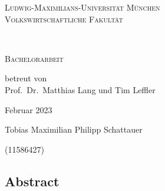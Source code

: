 \begin{titlepage}
    \vspace*{\fill}
    \centering

    \textsc{\Large Ludwig-Maximilians-Universität München}\\
    \textsc{Volkswirtschaftliche Fakultät}

    \vspace{3.2cm}

    \begin{doublespace}
        \makeatletter
        \textsc{ \Huge \titleDE}\\
        \textsc{\Large \subtitleDE}
        \makeatother
    \end{doublespace}


    \vspace{2.7cm}
    \huge \textsc{Bachelorarbeit}



    \vspace{0.3cm}
    \large \textrm{betreut von\\Prof.~Dr.~Matthias Lang und Tim Leffler}

    \vspace{2cm}
    \huge
    \textrm{Februar 2023}

    \vspace{2cm}
    \Large{\textrm{Tobias Maximilian Philipp Schattauer}}

    (11586427)

    \vspace*{\fill}
\end{titlepage}

\begin{titlepage}
    \null\vspace{3cm}
    \centering
    \begin{minipage}{0.8\textwidth}
        \section*{Abstract}
        
    \end{minipage}
\end{titlepage}



\tableofcontents
\newpage